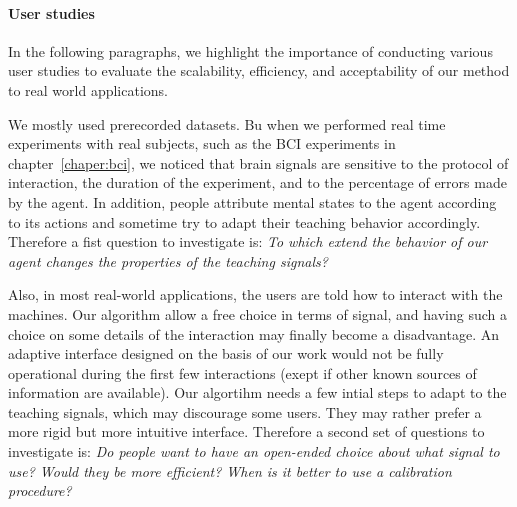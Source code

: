 \paragraph{User studies}


In the following paragraphs, we highlight the importance of conducting various user studies to evaluate the scalability, efficiency, and acceptability of our method to real world applications. 


We mostly used prerecorded datasets. Bu when we performed real time experiments with real subjects, such as the BCI experiments in chapter~\ref{chaper:bci}, we noticed that brain signals are sensitive to the protocol of interaction, the duration of the experiment, and to the percentage of errors made by the agent. In addition, people attribute mental states to the agent according to its actions and sometime try to adapt their teaching behavior accordingly. Therefore a fist question to investigate is: \emph{To which extend the behavior of our agent changes the properties of the teaching signals?}


Also, in most real-world applications, the users are told how to interact with the machines. Our algorithm allow a free choice in terms of signal, and having such a choice on some details of the interaction may finally become a disadvantage. An adaptive interface designed on the basis of our work would not be fully operational during the first few interactions (exept if other known sources of information are available). Our algortihm needs a few intial steps to adapt to the teaching signals, which may discourage some users. They may rather prefer a more rigid but more intuitive interface. Therefore a second set of questions to investigate is: \emph{Do people want to have an open-ended choice about what signal to use? Would they be more efficient? When is it better to use a calibration procedure?}


